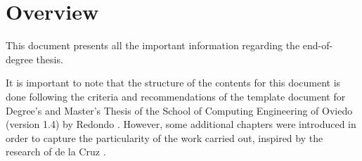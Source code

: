 \renewcommand{\documentname}{Overview}

\chapter{Overview}

This document presents all the important information regarding the \textit{\tfg} end-of-degree thesis.

It is important to note that the structure of the contents for this document is done following the criteria and recommendations of the template document for Degree's and Master's Thesis of the School of Computing Engineering of Oviedo (version 1.4) by Redondo \cite{redondotemplate}. However, some additional chapters were introduced in order to capture the particularity of the work carried out, inspired by the research of de la Cruz \cite{delacruz18metaheuristics}.

